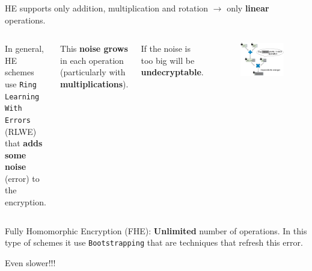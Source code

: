 \documentclass[10pt,handout]{beamer}
\begin{document}
\begin{frame}

    \frametitle{}
    HE supports only addition, multiplication and rotation $\rightarrow$ only \textbf{linear} operations.
\pause
    \vspace{0.3cm}
  \begin{columns}
      In general, HE schemes use \texttt{Ring Learning With Errors} (RLWE) that
      \textbf{adds some noise} (error) to the encryption.

\pause
\vspace{0.3cm}
      This \textbf{noise grows} in each operation (particularly with \textbf{multiplications}).

\vspace{0.3cm}
      If the noise is too big will be \textbf{undecryptable}.
\pause
        \begin{figure}[h!]
            \centering
            \includegraphics[scale=0.2]{multNoise.jpg}
        \end{figure}

\end{columns}

\pause
    Fully Homomorphic Encryption (FHE): \textbf{Unlimited} number of operations. In this type of schemes
    it use \texttt{Bootstrapping} that are techniques that refresh this error.

\pause
    Even slower!!!
\end{frame}
\end{document}
